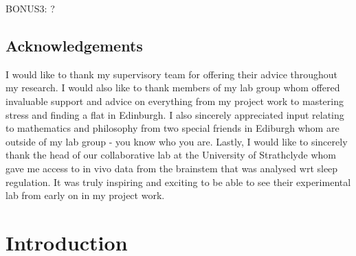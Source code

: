 \documentclass[mphil,deptreport,ai]{infthesis} %
\begin{document}
\begin{preliminary}
{BONUS3: ?
}

\maketitle

\section*{Acknowledgements}

I would like to thank my supervisory team for offering their advice throughout my research.
I would also like to thank members of my lab group whom offered invaluable support and advice on everything from my project work to mastering stress and finding a flat in Edinburgh.
I also sincerely appreciated input relating to mathematics and philosophy from two special friends in Ediburgh whom are outside of my lab group - you know who you are.
Lastly, I would like to sincerely thank the head of our collaborative lab at the University of Strathclyde whom gave me access to in vivo data from the brainstem that was analysed wrt sleep regulation. It was truly inspiring and exciting to be able to see their experimental lab from early on in my project work.


\tableofcontents
\end{preliminary}


\chapter{Introduction}




\end{document}
